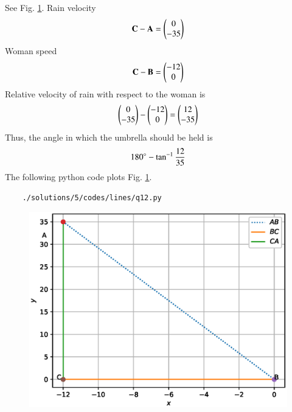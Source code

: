 See Fig. \ref{fig:3.8.5_qtwelve}.	Rain velocity 
\begin{align}
\mathbf{C} -\mathbf{A} = \begin{pmatrix}0\\-35\end{pmatrix}
\end{align}
Woman speed
\begin{align}
\mathbf{C} -\mathbf{B} = \begin{pmatrix}-12\\0\end{pmatrix}
\end{align}
Relative velocity of rain with respect to the woman is
\begin{align}
 \begin{pmatrix}0\\-35\end{pmatrix} - \begin{pmatrix}-12\\0\end{pmatrix} = \begin{pmatrix}12\\-35\end{pmatrix}
\end{align}
%
Thus, the angle in which the umbrella should be held is
\begin{align}
180\degree - \tan ^{-1}\frac{12}{35}
\end{align}
%
The following python code plots  Fig. \ref{fig:3.8.5_qtwelve}.
	\begin{lstlisting}
	./solutions/5/codes/lines/q12.py
	\end{lstlisting}
\begin{figure}[!ht]
	\centering
	\includegraphics[width=\columnwidth]{./solutions/5/figs/lines/q12.eps}
	\caption{}
	\label{fig:3.8.5_qtwelve}	
	\end{figure}
	


